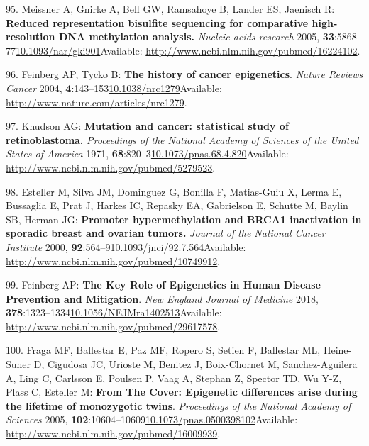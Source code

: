 \documentclass[
]{book}
\begin{document}
\leavevmode\hypertarget{ref-Meissner2005}{}%
95. Meissner A, Gnirke A, Bell GW, Ramsahoye B, Lander ES, Jaenisch R: \textbf{Reduced representation bisulfite sequencing for comparative high-resolution DNA methylation analysis.} \emph{Nucleic acids research} 2005, \textbf{33}:5868--77\href{https://doi.org/10.1093/nar/gki901}{10.1093/nar/gki901}Available: \url{http://www.ncbi.nlm.nih.gov/pubmed/16224102}.

\leavevmode\hypertarget{ref-Feinberg2004}{}%
96. Feinberg AP, Tycko B: \textbf{The history of cancer epigenetics}. \emph{Nature Reviews Cancer} 2004, \textbf{4}:143--153\href{https://doi.org/10.1038/nrc1279}{10.1038/nrc1279}Available: \url{http://www.nature.com/articles/nrc1279}.

\leavevmode\hypertarget{ref-Knudson1971}{}%
97. Knudson AG: \textbf{Mutation and cancer: statistical study of retinoblastoma.} \emph{Proceedings of the National Academy of Sciences of the United States of America} 1971, \textbf{68}:820--3\href{https://doi.org/10.1073/pnas.68.4.820}{10.1073/pnas.68.4.820}Available: \url{http://www.ncbi.nlm.nih.gov/pubmed/5279523}.

\leavevmode\hypertarget{ref-Esteller2000}{}%
98. Esteller M, Silva JM, Dominguez G, Bonilla F, Matias-Guiu X, Lerma E, Bussaglia E, Prat J, Harkes IC, Repasky EA, Gabrielson E, Schutte M, Baylin SB, Herman JG: \textbf{Promoter hypermethylation and BRCA1 inactivation in sporadic breast and ovarian tumors.} \emph{Journal of the National Cancer Institute} 2000, \textbf{92}:564--9\href{https://doi.org/10.1093/jnci/92.7.564}{10.1093/jnci/92.7.564}Available: \url{http://www.ncbi.nlm.nih.gov/pubmed/10749912}.

\leavevmode\hypertarget{ref-Feinberg2018}{}%
99. Feinberg AP: \textbf{The Key Role of Epigenetics in Human Disease Prevention and Mitigation}. \emph{New England Journal of Medicine} 2018, \textbf{378}:1323--1334\href{https://doi.org/10.1056/NEJMra1402513}{10.1056/NEJMra1402513}Available: \url{http://www.ncbi.nlm.nih.gov/pubmed/29617578}.

\leavevmode\hypertarget{ref-Fraga2005}{}%
100. Fraga MF, Ballestar E, Paz MF, Ropero S, Setien F, Ballestar ML, Heine-Suner D, Cigudosa JC, Urioste M, Benitez J, Boix-Chornet M, Sanchez-Aguilera A, Ling C, Carlsson E, Poulsen P, Vaag A, Stephan Z, Spector TD, Wu Y-Z, Plass C, Esteller M: \textbf{From The Cover: Epigenetic differences arise during the lifetime of monozygotic twins}. \emph{Proceedings of the National Academy of Sciences} 2005, \textbf{102}:10604--10609\href{https://doi.org/10.1073/pnas.0500398102}{10.1073/pnas.0500398102}Available: \url{http://www.ncbi.nlm.nih.gov/pubmed/16009939}.
\end{document}

